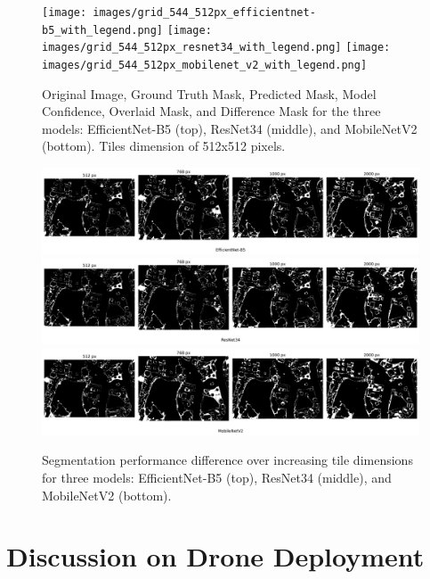 \documentclass[a4paper]{article}
\begin{document}
\begin{figure}[!htbp]
    \centering
    \texttt{[image: images/grid\_544\_512px\_efficientnet-b5\_with\_legend.png]}
    \texttt{[image: images/grid\_544\_512px\_resnet34\_with\_legend.png]}
    \texttt{[image: images/grid\_544\_512px\_mobilenet\_v2\_with\_legend.png]}
    \caption{Original Image, Ground Truth Mask, Predicted Mask, Model Confidence, Overlaid Mask, and Difference Mask for the three models:  EfficientNet-B5 (top), ResNet34 (middle), and MobileNetV2 (bottom). Tiles dimension of 512x512 pixels.}
    \label{fig:grids_544_combined}
    \vspace{10pt}
\end{figure}

\begin{figure}[h]
    \centering
    \includegraphics[width=\textwidth]{images/different_sizes_544_EfficientNet-B5.png}
    \includegraphics[width=\textwidth]{images/different_sizes_544_ResNet34.png}
    \includegraphics[width=\textwidth]{images/different_sizes_544_MobileNetV2.png}
    \caption{Segmentation performance difference over increasing tile dimensions for three models: EfficientNet-B5 (top), ResNet34 (middle), and MobileNetV2 (bottom).}
    \label{fig:different_sizes_combined}
    \vspace{10pt}
\end{figure}

\section{Discussion on Drone Deployment}
\end{document}
